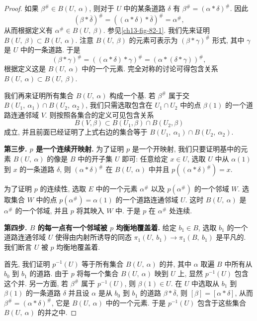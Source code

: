 \begin{proof}
如果 $\beta^{\#}\in B(U,\ \alpha)$, 则对于 $U$ 中的某条道路 $\delta$ 有 $\beta^{\#}=(\alpha*\delta)^{\#}$. 因此
\[
(\beta*\overline{\delta})^{\#}=((\alpha*\delta)*\overline{\delta})^{\#}=\alpha^{\#},
\]
从而根据定义有 $\alpha^{\#}\in B(U,\ \beta)$. 参见\cref{ch13-fig-82-1}. 我们先来证明 $B(U,\ \beta)\subset B(U,\ \alpha)$. 注意 $B(U,\ \beta)$ 的元素可表示为 $(\beta*\gamma)^{\#}$ 形式, 其中 $\gamma$ 是 $U$ 中的一条道路. 于是
\[
(\beta*\gamma)^{\#}=((\alpha*\delta)*\gamma)^{\#}=(\alpha*(\delta*\gamma))^{\#},
\]
根据定义这是 $B(U,\ \alpha)$ 中的一个元素. 完全对称的讨论可得包含关系 $B(U,\ \alpha)\subset B(U,\ \beta)$.


我们再来证明所有集合 $B(U,\ \alpha)$ 构成一个基. 若 $\beta^{\#}$ 属于交 $B(U_{1},\ \alpha_{1})\cap B(U_{2},\ \alpha_{2})$, 我们只需选取包含在 $U_{1}\cap U_{2}$ 中的点 $\beta(1)$ 的一个道路连通邻域 $V$. 则按照各集合的定义可见包含关系
\[
B(V,\beta)\subset B(U_{1},\beta)\cap B(U_{2},\beta)
\]
成立, 并且前面已经证明了上式右边的集合等于 $B(U_{1},\ \alpha_{1})\cap B(U_{2},\ \alpha_{2})$.

\textbf{第三步. $p$ 是一个连续开映射.} 为了证明 $p$ 是一个开映射, 我们只要证明基中的元素 $B(U,\ \alpha)$ 的像是 $B$ 中的开子集 $U$ 即可: 任意给定 $x\in U$, 选取 $U$ 中从 $\alpha(1)$ 到 $x$ 的一条道路 $\delta$, 则 $(\alpha*\delta)^{\#}$ 在 $B(U,\ \alpha)$ 中并且 $p((\alpha*\delta)^{\#})=x$.

为了证明 $p$ 的连续性, 选取 $E$ 中的一个元素 $\alpha^{\#}$ 以及 $p(\alpha^{\#})$ 的一个邻域 $W$. 选取集合 $W$ 中的点 $p(\alpha^{\#})=\alpha(1)$ 的一个道路连通邻域 $U$. 这时 $B(U,\ \alpha)$ 是 $\alpha^{\#}$ 的一个邻域, 并且 $p$ 将其映入 $W$ 中. 于是 $p$ 在 $\alpha^{\#}$ 处连续.

\textbf{第四步. $B$ 的每一点有一个邻域被 $p$ 均衡地覆盖着.} 给定 $b_{1}\in B$, 选取 $b_{1}$ 的一个道路连通邻域 $U$ 使得由内射所诱导的同态 $\pi_{1}(U,\ b_{1})\to\pi_{1}(B,\ b_{1})$ 是平凡的. 我们断言 $U$ 被 $p$ 均衡地覆盖着.

首先, 我们证明 $p^{-1}(U)$ 等于所有集合 $B(U,\ \alpha)$ 的并, 其中 $\alpha$ 取遍 $B$ 中所有从 $b_{0}$ 到 $b_{1}$ 的道路. 由于 $p$ 将每一个集合 $B(U,\ \alpha)$ 映到 $U$ 上, 显然 $p^{-1}(U)$ 包含这个并. 另一方面, 若 $\beta^{\#}$ 属于 $p^{-1}(U)$, 则 $\beta(1)\in U$. 在 $U$ 中选取从 $b_{1}$ 到 $\beta(1)$ 的一条道路 $\delta$ 并且设 $\alpha$ 是从 $b_{0}$ 到 $b_{1}$ 的道路 $\beta*\overline{\delta}$, 则 $[\beta]=[\alpha*\delta]$, 从而 $\beta^{\#}=(\alpha*\delta)^{\#}$, 它是 $B(U,\ \alpha)$ 中的一个元素. 于是 $p^{-1}(U)$ 包含于这些集合 $B(U,\ \alpha)$ 的并之中.


\end{proof}
